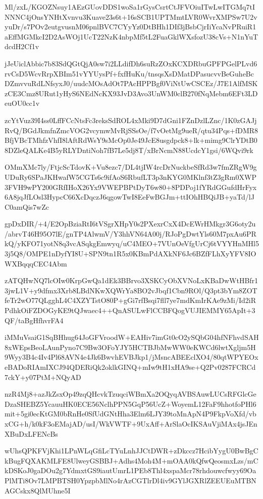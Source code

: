 \documentclass[]{article}
\newenvironment{Shaded}{\begin{snugshade}}{\end{snugshade}}
\newcommand{\NormalTok}[1]{#1}
\begin{document}
\begin{Shaded}
\begin{Highlighting}[]
\NormalTok{Ml/zxL/KGOZNsuy1AEzGUovDDS1woSa1rGysCsrtCtJFVOiuITwLwITGMq7tINNNC4jOnsYNHtXvnvu3Kuave23s6t+16sSCB1UPTMmtLVR0WvrXMPSw7U2vyuDr/s7POv2eutgvusnM06pnlBVC7CYyYz0DtBHh1DIf3jBsbCjrIiYcaNvPRuiR1aEffMGMkcI2D2AsWOj1UcT22NzK4nbpMf5tL2FuaGklWXsfozU38cVs+N1nYuTdcdH2Cf1v}

\NormalTok{jJeUiclAbbic7b83SdQGtQjA0sw7i2LLdifDh6suRzZOxKCXDRbuGPFPGelPLvd6rvCsD5WcvRrpXBIm51vYYUysPf+fxfHuKu/tnsqsXsDMatDPasucvvBeGuheBcDZmvvuRdLNfsyxJ0/uudcMOsAdOt7PAcHPPBgf0ViNtUwCSCEz/J7E1AlfMSKzCE3Cmz8URut1yHyS6NEdNcKX93JvD3Avo3UnWM0clB270fNqMebm6EFt3LDeuOU0cc1v}

\NormalTok{zcYtVuz39I4ss0LffFCcNtsFc3reksSdROL4xMki9D7dGni1FZnDzlLZnc/1K0zGAJjRvQ/BGdJkmfnZmcVOG2vcymwMvRjSSsOe/f7vOetMg9ueR/qtu34Pqs+fDMR8BfjVBcTMhfzVhfI8lAftRdWsY9sMcOp0Je49JcE8usgdpck8+lk+mimg9ClrYDtB08DZleQALKe4B5yRLYDntiNoh7fB7Le5dj8T/xBrNcmN88UcdcY1gsi/6WQvi9rk}

\NormalTok{OMmXMc7ly/FtjcScTdovK+Vu8ezc7/DL4tjIW4rcDrNuckbeSfRd3w7fmZRgW9gUDuRy6SPaJKHwafW5CGTs6c9ifAoS6RbufLT3p3nKYG0MKlnf3tZ3gRm0XWP3FVH9wPY200GRfIHoX26Yx9VWEPBPtDyT6w80+8PDPoj1fYRdGGufdHrFyx6A8jqJfLOsl3HypcC66XcDqczJ6qgowTwI8EeFwBGJm+ttIOhHBQiJB+yaTd/lJC0amQis7wZc}

\NormalTok{gpDxDIR/+4/E2OpBziaRtI6tVSgrXHpY0s2PXexrCxX4DcEWrHMkgr3G6oty2u/abrvT46H95O7lE/gnTP4AlwmV/Y3hhVN64A00j/RJoPgDwtYls60M7pxAu6PRkQ/yKFO71yotN8q3vcASqkgEmwyq/uC4MEO+7VUnOeVfgUrCj6tVYYHnMHl53j5Q8/OMPE1nDyfYI8U+SPN9tn1R5x0KBmPdAXkNF6Jc6BZfFLhXyYFV8IOWXBqqqCEC4Abm}

\NormalTok{zATQHwNQ7lcOIw0KrpGwQa1dEk3BBrvo3XSKCyObXVNoLxKBaDwWtHBfr13jwL1V+y9dfmx3Xrb8LBdNKwXQWrYa8BO2vJbqf1Cbn9ROl/Q3pt3bYm8ZOTfeTr2wO77QLgghL4C4XZYTstO80P+gGi7rfBsqi7fll7ye7mdKmIrKAe9zMi/Id2iRPdhkOiFZDOGyKE9tQJwaec4++QnASULwFlCCBFQogVUJIEMMY65ApIt+3QF/taBgHfhvrFA4}

\NormalTok{iMMuVsaiG1SqBHhug64JoGFVroodW+EAHiv7imGt0cO2ySQbG04hfNFhvdSAH8xWEpsBeoLAunPyno7C9Bw3OFoYJY5HCTBJbMwWW0eKWCd6lwtXgljm5H9Wyy3B4c4Iv4Pl68AVN4e4Jk6BwvhEVBJkp1/jMsncABEEclXO4/80qtWPYEOxeBADoRIAmIXCJ94QDERiQk2oklkGINQ+mIw9tH1xHA9se+Q2Pv0287FCRCd7ckY+y07PtM+NQyAD}

\NormalTok{nzR4Mj8+azJkZsxOp49zqQHcvkTzuqciWBmXa2OQyqAVBSAuwLUCsRFGlcGeDzaSHEBZ5YcauuHK0ECE56NclhPPN5GqP56UcZ+WoyemL12FaF9hhotfoPHl6mit+5gi0ecKtGM0bRnHe0SfUdGNtHha3Elm6LJY39toMnApN4P9FkpVoXfd/vbxCG+h/k0kF3oEMajAD/usI/WkVWTF+9UxAff+ArSlaOcIKSAuVjiMAx4jsJEnXBuDxLFENcBs}

\NormalTok{wUhsQPKFVjKhi1LPnWLqGfiLcTYuLnhJJCtDWR+zDkccz7HcibYygU0BwBgCkBugFQXAKMLFE8UlweyGSBBJ+Adhs4Moh4M+mOAA0kQfwQeosmxLzs/mCkDSKoJ0gaDOu2g7YdmxtGS9iautUmrL1PEb8Thl4xspaMcr78rhdouwcfwyy69OaPlMTi8Ov7LMPBTSH0YpzpbMlNo4rAzCGTlrDl4iv9GYlJGXRlZEEUEuMTBNAGCskx8QlMUhne5I}


\end{Highlighting}
\end{Shaded}
\end{document}
